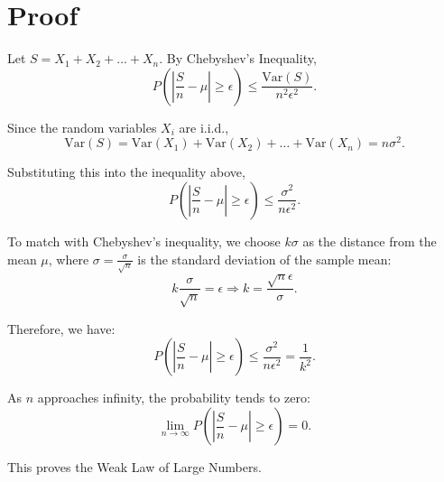\documentclass{article}
\begin{document}
\author{}
\date{}





\section*{Proof}
Let $S = X_1 + X_2 + \ldots + X_n$. By Chebyshev's Inequality,
\[
P\left(\left|\frac{S}{n} - \mu\right| \geq \epsilon\right) \leq \frac{\text{Var}(S)}{n^2 \epsilon^2}.
\]

Since the random variables $X_i$ are i.i.d.,
\[
\text{Var}(S) = \text{Var}(X_1) + \text{Var}(X_2) + \ldots + \text{Var}(X_n) = n \sigma^2.
\]

Substituting this into the inequality above,
\[
P\left(\left|\frac{S}{n} - \mu\right| \geq \epsilon\right) \leq \frac{\sigma^2}{n \epsilon^2}.
\]

To match with Chebyshev's inequality, we choose $k\sigma$ as the distance from the mean $\mu$, where $\sigma = \frac{\sigma}{\sqrt{n}}$ is the standard deviation of the sample mean:
\[
k\frac{\sigma}{\sqrt{n}} = \epsilon \Rightarrow k = \frac{\sqrt{n} \epsilon}{\sigma}.
\]

Therefore, we have:
\[
P\left(\left|\frac{S}{n} - \mu\right| \geq \epsilon\right) \leq \frac{\sigma^2}{n \epsilon^2} = \frac{1}{k^2}.
\]

As $n$ approaches infinity, the probability tends to zero:
\[
\lim_{n \to \infty} P\left(\left|\frac{S}{n} - \mu\right| \geq \epsilon\right) = 0.
\]

This proves the Weak Law of Large Numbers.
\end{document}
